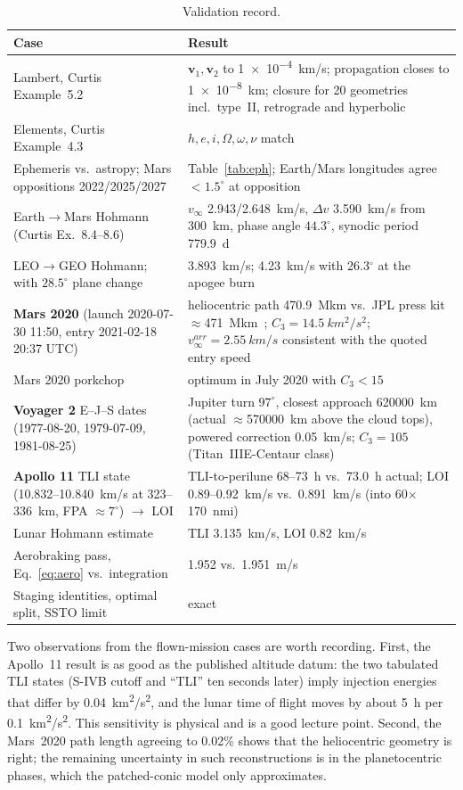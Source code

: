 \documentclass[11pt,a4paper]{article}
\newcommand{\dv}{\Delta v}
\newcommand{\vinf}{v_\infty}
\begin{document}
\begin{table}[h]\centering\small
\caption{Validation record.}
\label{tab:val}
\begin{tabular}{p{}p{}}\toprule
Case & Result \\\midrule
Lambert, Curtis Example~5.2 & $\bm v_1,\bm v_2$ to \SI{1e-4}{km/s}; propagation closes to \SI{1e-8}{km}; closure for 20 geometries incl.\ type~II, retrograde and hyperbolic \\
Elements, Curtis Example~4.3 & $h,e,i,\Omega,\omega,\nu$ match \\
Ephemeris vs.\ astropy; Mars oppositions 2022/2025/2027 & Table~\ref{tab:eph}; Earth/Mars longitudes agree $<1.5^\circ$ at opposition \\
Earth$\to$Mars Hohmann (Curtis Ex.~8.4--8.6) & $\vinf$ 2.943/2.648~km/s, $\dv$ 3.590~km/s from \SI{300}{km}, phase angle $44.3^\circ$, synodic period 779.9~d \\
LEO$\to$GEO Hohmann; with $28.5^\circ$ plane change & 3.893~km/s; 4.23~km/s with 26.3$^\circ$ at the apogee burn \\
\textbf{Mars 2020} (launch 2020-07-30 11:50, entry 2021-02-18 20:37 UTC) & heliocentric path \SI{470.9}{Mkm} vs.\ JPL press kit $\approx$\SI{471}{Mkm}~\cite{m2020}; $C_3=\SI{14.5}{km^2/s^2}$; $\vinf^{arr}=\SI{2.55}{km/s}$ consistent with the quoted entry speed \\
Mars 2020 porkchop & optimum in July 2020 with $C_3<15$ \\
\textbf{Voyager 2} E--J--S dates (1977-08-20, 1979-07-09, 1981-08-25) & Jupiter turn $97^\circ$, closest approach \SI{620000}{km} (actual $\approx$\SI{570000}{km} above the cloud tops), powered correction \SI{0.05}{km/s}; $C_3=105$ (Titan~IIIE-Centaur class) \\
\textbf{Apollo 11} TLI state~\cite{a11} (10.832--10.840~km/s at 323--336~km, FPA $\approx7^\circ$) $\to$ LOI & TLI-to-perilune 68--73~h vs.\ 73.0~h actual; LOI 0.89--0.92~km/s vs.\ 0.891~km/s (into 60$\times$170~nmi) \\
Lunar Hohmann estimate & TLI 3.135~km/s, LOI 0.82~km/s \\
Aerobraking pass, Eq.~\eqref{eq:aero} vs.\ integration & 1.952 vs.\ 1.951~m/s \\
Staging identities, optimal split, SSTO limit & exact \\\bottomrule
\end{tabular}
\end{table}

Two observations from the flown-mission cases are worth recording. First, the Apollo~11 result
is as good as the published altitude datum: the two tabulated TLI states (S-IVB cutoff and
``TLI'' ten seconds later) imply injection energies that differ by \SI{0.04}{km^2/s^2}, and the
lunar time of flight moves by about \SI{5}{h} per \SI{0.1}{km^2/s^2}. This sensitivity is
physical and is a good lecture point. Second, the Mars~2020 path length agreeing to 0.02\% shows
that the heliocentric geometry is right; the remaining uncertainty in such reconstructions is
in the planetocentric phases, which the patched-conic model only approximates.
\end{document}
